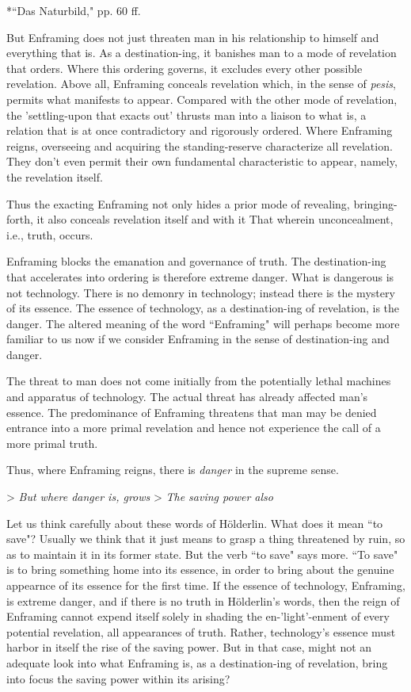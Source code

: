 *``Das Naturbild," pp. 60 ff.

But Enframing does not just threaten man in his relationship to himself and everything that is. As a destination-ing, it banishes man to a mode of revelation that orders. Where this ordering governs, it excludes every other possible revelation. Above all, Enframing conceals revelation which, in the sense of \textit{pesis}, permits what manifests to appear. Compared with the other mode of revelation, the 'settling-upon that exacts out' thrusts man into a liaison to what is, a relation that is at once contradictory and rigorously ordered. Where Enframing reigns, overseeing and acquiring the standing-reserve characterize all revelation. They don't even permit their own fundamental characteristic to appear, namely, the revelation itself.

Thus the exacting Enframing not only hides a prior mode of revealing, bringing-forth, it also conceals revelation itself and with it That wherein unconcealment, i.e., truth, occurs.

Enframing blocks the emanation and governance of truth. The destination-ing that accelerates into ordering is therefore extreme danger. What is dangerous is not technology. There is no demonry in technology; instead there is the mystery of its essence. The essence of technology, as a destination-ing of revelation, is the danger. The altered meaning of the word ``Enframing" will perhaps become more familiar to us now if we consider Enframing in the sense of destination-ing and danger.

The threat to man does not come initially from the potentially lethal machines and apparatus of technology. The actual threat has already affected man's essence. The predominance of Enframing threatens that man may be denied entrance into a more primal revelation and hence not experience the call of a more primal truth.

Thus, where Enframing reigns, there is \textit{danger} in the supreme sense.

> \textit{But where danger is, grows}
> \textit{The saving power also}

Let us think carefully about these words of H\"{o}lderlin. What does it mean ``to save"? Usually we think that it just means to grasp a thing threatened by ruin, so as to maintain it in its former state. But the verb ``to save" says more. ``To save" is to bring something home into its essence, in order to bring about the genuine appearnce of its essence for the first time. If the essence of technology, Enframing, is extreme danger, and if there is no truth in H\"{o}lderlin's words, then the reign of Enframing cannot expend itself solely in shading the en-'light'-enment of every potential revelation, all appearances of truth. Rather, technology's essence must harbor in itself the rise of the saving power. But in that case, might not an adequate look into what Enframing is, as a destination-ing of revelation, bring into focus the saving power within its arising? 

